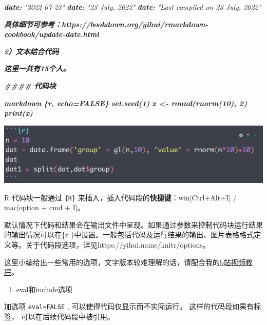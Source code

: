 \documentclass[
]{book}
\newenvironment{Shaded}{\begin{snugshade}}{\end{snugshade}}
\newcommand{\AnnotationTok}[1]{\textcolor[rgb]{0.56,0.35,0.01}{\textbf{\textit{#1}}}}
\newcommand{\CommentTok}[1]{\textcolor[rgb]{0.56,0.35,0.01}{\textit{#1}}}
\newcommand{\InformationTok}[1]{\textcolor[rgb]{0.56,0.35,0.01}{\textbf{\textit{#1}}}}
\providecommand{\tightlist}{%
  \setlength{\itemsep}{0pt}\setlength{\parskip}{0pt}}
\begin{document}
\begin{Shaded}
\begin{Highlighting}[]
\AnnotationTok{date:}\CommentTok{ "2022{-}07{-}23"}
\AnnotationTok{date:}\CommentTok{ "23 July, 2022"}
\AnnotationTok{date:}\CommentTok{ "Last compiled on 23 July, 2022"}
\InformationTok{\textasciigrave{}\textasciigrave{}\textasciigrave{}}

\InformationTok{具体细节可参考：https://bookdown.org/yihui/rmarkdown{-}cookbook/update{-}date.html}

\InformationTok{2）文本结合代码}



\InformationTok{这里一共有15个人。}


\InformationTok{\#\#\#\# 代码块}

\InformationTok{\textasciigrave{}\textasciigrave{}\textasciigrave{}\textasciigrave{}markdown}
\InformationTok{\textasciigrave{}\textasciigrave{}\textasciigrave{}\{r, echo=FALSE\} }
\InformationTok{set.seed(1)}
\InformationTok{x \textless{}{-} round(rnorm(10), 2)}
\InformationTok{print(x)}
\InformationTok{\textasciigrave{}\textasciigrave{}\textasciigrave{}}
\end{Highlighting}
\end{Shaded}

\includegraphics{images/paste-5279D793.png}

R 代码块一般通过 \texttt{\{R\}} 来插入，插入代码段的\textbf{快捷键}：win{[}Ctrl+Alt+I{]} /
mac{[}option + cmd + I{]}。

默认情况下代码和结果会在输出文件中呈现。如果通过参数来控制代码块运行结果的输出情况可以在\{r
\}中设置。一般包括代码及运行结果的输出、图片表格格式定义等。关于代码段选项，详见https://yihui.name/knitr/options。

这里小编给出一些常用的选项，文字版本较难理解的话，请配合我的\href{https://www.bilibili.com/video/BV1ib4y1X7r9/}{b站视频教程}。

\begin{enumerate}
\def\labelenumi{\arabic{enumi}.}
\tightlist
\item
  eval和include选项
\end{enumerate}

加选项 \texttt{eval=FALSE} , 可以使得代码仅显示而不实际运行。
这样的代码段如果有标签， 可以在后续代码段中被引用。
\end{document}
